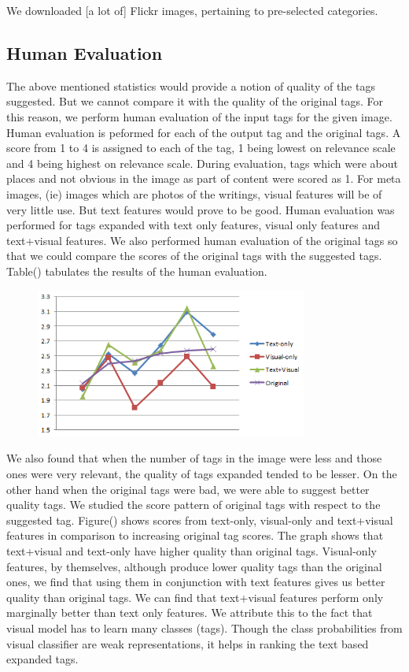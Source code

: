 \documentclass[12pt]{article}
\begin{document}
We downloaded [a lot of] Flickr images, pertaining to pre-selected categories.

\subsection{Human Evaluation}
The above mentioned statistics would provide a notion of quality of the tags suggested. But
we cannot compare it with the quality of the original tags. For this reason, we perform human
evaluation of the input tags for the given image. Human evaluation is peformed for each of the
output tag and the original tags. A score from 1 to 4 is assigned to each of the tag, 1 being
lowest on relevance scale and 4 being highest on relevance scale. During evaluation, tags which
were about places and not obvious in the image as part of content were scored as 1. For meta images,
(ie) images which are photos of the writings, visual features will be of very little use. But
text features would prove to be good. Human evaluation was performed for tags expanded with
text only features, visual only features and text+visual features. We also performed human
evaluation of the original tags so that we could compare the scores of the original tags with
the suggested tags. Table() tabulates the results of the human evaluation.

\begin{figure}[t]
\begin{center}
\includegraphics[width=0.8\textwidth]{humanEvalGraph.png}
\end{center}
\end{figure}


We also found that when the number of tags in the image were less and those ones were very relevant,
the quality of tags expanded tended to be lesser. On the other hand when the original tags were bad,
we were able to suggest better quality tags. We studied the score pattern of original tags with respect
to the suggested tag. Figure() shows scores from text-only, visual-only and text+visual features in
comparison to increasing original tag scores. The graph shows that text+visual and text-only have
higher quality than original tags. Visual-only features, by themselves, although produce lower quality
tags than the original ones, we find that using them in conjunction with text features gives us better
quality than original tags. We can find that text+visual features perform only marginally better than
text only features. We attribute this to the fact that visual model has to learn many classes (tags).
Though the class probabilities from visual classifier are weak representations, it helps in ranking
the text based expanded tags.
\end{document}

